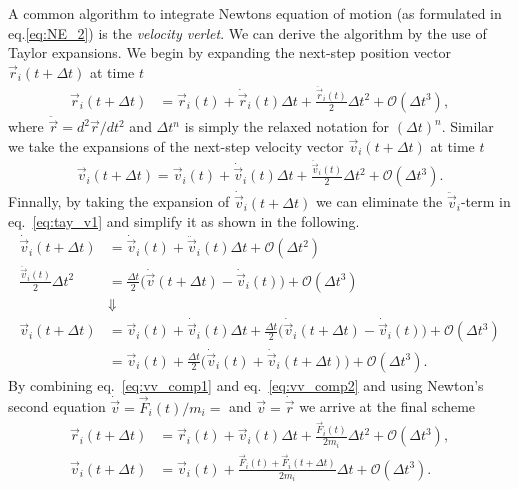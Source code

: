 A common algorithm to integrate Newtons equation of motion (as formulated in
eq.\eqref{eq:NE_2}) is the \textit{velocity verlet}. We can derive the algorithm
by the use of Taylor expansions. We begin by expanding the next-step position
vector $\vec{r}_i(t + \Delta t)$ at time $t$
\begin{align}
  \vec{r}_i(t + \Delta t) &= \vec{r}_i(t) + \dot{\vec{r}}_i(t) \Delta t + \frac{\ddot{\vec{r}}_i(t)}{2} \Delta t^2 + \mathcal{O}(\Delta t^3) \label{eq:vv_comp1},
\end{align}
where $\ddot{\vec{r}} = d^2\vec{r}/dt^2$ and $\Delta t^n$ is simply the relaxed
notation for $(\Delta t)^n$. Similar we take the expansions of the next-step
velocity vector $\vec{v}_i(t+\Delta t)$ at time $t$ 
\begin{align}
  \vec{v}_i(t+\Delta t) = \vec{v}_i(t) + \dot{\vec{v}}_i(t) \Delta t + \frac{\ddot{\vec{v}}_i(t)}{2}\Delta t^2 + \mathcal{O}(\Delta t^3).
  \label{eq:tay_v1}
\end{align}
Finnally, by taking the expansion of $\dot{\vec{v}}_i(t+\Delta t)$ we can
eliminate the $\ddot{\vec{v}}_i$-term in eq.~\eqref{eq:tay_v1} and simplify it
as shown in the following.
\begin{align}
  \dot{\vec{v}}_i(t+\Delta t) &= \dot{\vec{v}}_i(t) + \ddot{\vec{v}}_i(t) \Delta t + \mathcal{O}(\Delta t^2) \nonumber \\
  \frac{\ddot{\vec{v}}_i(t)}{2}\Delta t^2 &= \frac{\Delta t}{2}\Big( \dot{\vec{v}}(t+\Delta t) - \dot{\vec{v}}_i(t)\Big) + \mathcal{O}(\Delta t^3) \nonumber \\
  &\Downarrow \nonumber \\
  \vec{v}_i(t+\Delta t) &= \vec{v}_i(t) + \dot{\vec{v}}_i(t) \Delta t + \frac{\Delta t}{2}\Big( \dot{\vec{v}}_i(t+\Delta t) - \dot{\vec{v}}_i(t)\Big) + \mathcal{O}(\Delta t^3) \nonumber \\
  &=  \vec{v}_i(t) + \frac{\Delta t}{2}\Big( \dot{\vec{v}}_i(t) +  \dot{\vec{v}}_i(t+\Delta t)\Big) + \mathcal{O}(\Delta t^3).
  \label{eq:vv_comp2}
\end{align}
By combining eq.~\eqref{eq:vv_comp1} and eq.~\eqref{eq:vv_comp2} and using
Newton's second equation $\dot{\vec{v}} = \vec{F}_i(t)/m_i = $ and $\vec{v} =
\dot{\vec{r}}$ we arrive at the final scheme
\begin{align*}
  \vec{r}_i(t + \Delta t) &= \vec{r}_i(t) + \vec{v}_i(t) \Delta t + \frac{\vec{F}_i(t)}{2m_i}\Delta t^2 + \mathcal{O}(\Delta t^3), \\
  \vec{v}_i(t+\Delta t)  &= \vec{v}_i(t) + \frac{\vec{F}_i(t) + \vec{F}_i(t+\Delta t)}{2m_i}  \Delta t + \mathcal{O}(\Delta t^3).
\end{align*}
